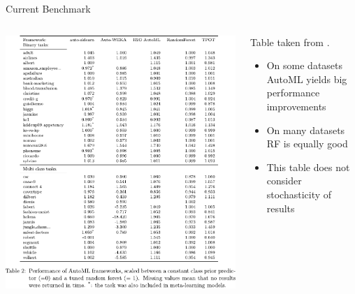 \begin{frame}{Current Benchmark}
  \begin{columns}
    \begin{column}{0.43\textwidth}
      \vspace{-0.7cm}
      \begin{center}
        \includegraphics[width = \textwidth]{images/gijsbers_open_2019_tab2.pdf}
      \end{center}
    \end{column}%
    \begin{column}{0.57\textwidth}
      Table taken from .

      \begin{itemize}
        \item On some datasets AutoML yields big performance improvements
        \item On many datasets RF is equally good
        \item This table does not consider stochasticity of results
      \end{itemize}

    \end{column}
  \end{columns}
\end{frame}

